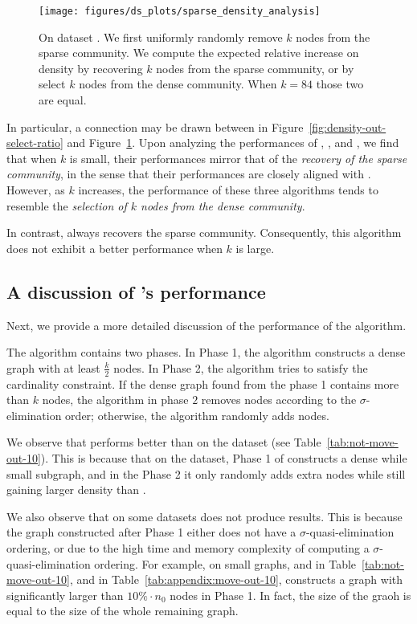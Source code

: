 \begin{figure}[t!]
	\centering 
	\texttt{[image: figures/ds\_plots/sparse\_density\_analysis]}
	\caption{On dataset \sparse. 
	We first uniformly randomly remove $k$ nodes from the sparse community. 
	We compute the expected relative increase on density by recovering $k$ nodes from the sparse community, 
	or by select $k$ nodes from the dense community. 
		When $k = 84$ those two are equal.}
	\label{fig:sparse-analysis}
\end{figure}

In particular, a connection may be drawn between \sparse in Figure~\ref{fig:density-out-select-ratio} and Figure~\ref{fig:sparse-analysis}. 
Upon analyzing the performances of \denseSDPalgo, \denseSDPMerge, and \densePeelMerge, we find that when $k$ is small, 
their performances mirror that of the \emph{recovery of the sparse community}, in the sense that their performances are closely aligned with \denseinit. 
However, as $k$ increases, the performance of these three algorithms tends to resemble the \emph{selection of $k$ nodes from the dense community}.

In contrast, \denseGreedy always recovers the sparse community. 
Consequently, this algorithm does not exhibit a better performance when $k$ is large.


\subsection{A discussion of \denseSQD's performance}
\label{sec:add-exp:sqd}
Next, we provide a more detailed discussion of the performance of the \denseSQD
algorithm.

The \denseSQD algorithm contains two phases. 
In Phase 1, the algorithm constructs a dense graph with at least $\frac{k}{2}$ nodes. 
In Phase 2, the algorithm tries to satisfy the cardinality constraint. 
If the dense graph found from the phase 1 contains more than $k$ nodes, 
the algorithm in phase $2$ removes nodes according to the $\sigma$-elimination order; 
otherwise, the algorithm randomly adds nodes. 

We observe that \denseSQD performs better than \denseGreedy on the \dblp dataset
(see Table~\ref{tab:not-move-out-10}). 
This is because that on the \dblp dataset, Phase 1 of \denseSQD constructs a
dense while small subgraph,
and in the Phase 2 it only randomly adds extra nodes while still gaining larger density than \denseGreedy. 


We also observe that on some datasets \denseSQD does not produce results. 
This is because the graph constructed after Phase 1 either does not have a
$\sigma$-quasi-elimination ordering,
or due to the high time and memory complexity of computing a
$\sigma$-quasi-elimination ordering.
For example, on small graphs, \balanced and \dense in Table~\ref{tab:not-move-out-10}, and \dense in Table~\ref{tab:appendix:move-out-10}, 
\denseSQD constructs a graph with significantly larger than $10\%\cdot n_0$
nodes in Phase 1.
In fact, the size of the graoh is equal to the size of the whole remaining graph. 

